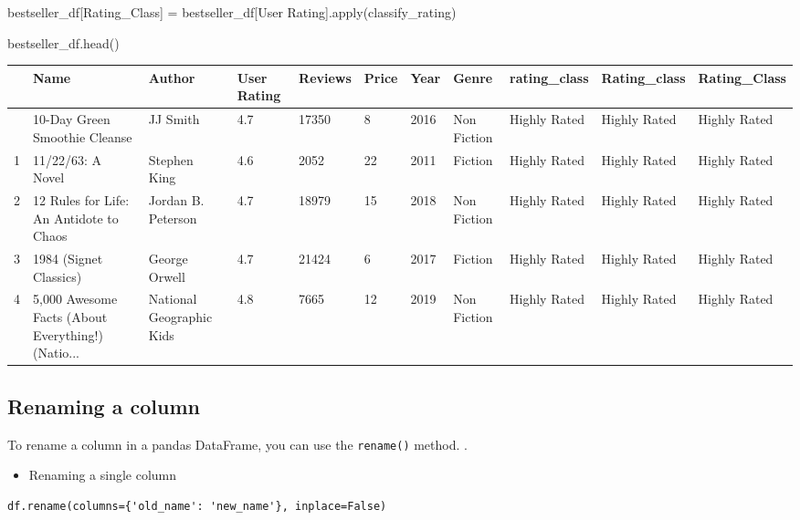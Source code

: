 \documentclass[
  letterpaper,
  DIV=11,
  numbers=noendperiod]{scrreprt}
\newenvironment{Shaded}{\begin{snugshade}}{\end{snugshade}}
\newcommand{\BuiltInTok}[1]{\textcolor[rgb]{0.00,0.23,0.31}{#1}}
\newcommand{\NormalTok}[1]{\textcolor[rgb]{0.00,0.23,0.31}{#1}}
\newcommand{\OperatorTok}[1]{\textcolor[rgb]{0.37,0.37,0.37}{#1}}
\newcommand{\StringTok}[1]{\textcolor[rgb]{0.13,0.47,0.30}{#1}}
\providecommand{\tightlist}{%
  \setlength{\itemsep}{0pt}\setlength{\parskip}{0pt}}\usepackage{longtable,booktabs,array}
\begin{document}
\begin{Shaded}
\begin{Highlighting}[]
\NormalTok{bestseller\_df[}\StringTok{\textquotesingle{}Rating\_Class\textquotesingle{}}\NormalTok{] }\OperatorTok{=}\NormalTok{ bestseller\_df[}\StringTok{\textquotesingle{}User Rating\textquotesingle{}}\NormalTok{].}\BuiltInTok{apply}\NormalTok{(classify\_rating)}

\NormalTok{bestseller\_df.head()}
\end{Highlighting}
\end{Shaded}

\begin{longtable}[]{@{}lllllllllll@{}}
\toprule\noalign{}
& Name & Author & User Rating & Reviews & Price & Year & Genre &
rating\_class & Rating\_class & Rating\_Class \\
\midrule\noalign{}
\endhead
\bottomrule\noalign{}
\endlastfoot
0 & 10-Day Green Smoothie Cleanse & JJ Smith & 4.7 & 17350 & 8 & 2016 &
Non Fiction & Highly Rated & Highly Rated & Highly Rated \\
1 & 11/22/63: A Novel & Stephen King & 4.6 & 2052 & 22 & 2011 & Fiction
& Highly Rated & Highly Rated & Highly Rated \\
2 & 12 Rules for Life: An Antidote to Chaos & Jordan B. Peterson & 4.7 &
18979 & 15 & 2018 & Non Fiction & Highly Rated & Highly Rated & Highly
Rated \\
3 & 1984 (Signet Classics) & George Orwell & 4.7 & 21424 & 6 & 2017 &
Fiction & Highly Rated & Highly Rated & Highly Rated \\
4 & 5,000 Awesome Facts (About Everything!) (Natio... & National
Geographic Kids & 4.8 & 7665 & 12 & 2019 & Non Fiction & Highly Rated &
Highly Rated & Highly Rated \\
\end{longtable}

\hypertarget{renaming-a-column}{%
\subsection{Renaming a column}\label{renaming-a-column}}

To rename a column in a pandas DataFrame, you can use the
\texttt{rename()} method. .

\begin{itemize}
\tightlist
\item
  Renaming a single column
\end{itemize}

\begin{verbatim}
df.rename(columns={'old_name': 'new_name'}, inplace=False)
\end{verbatim}
\end{document}
